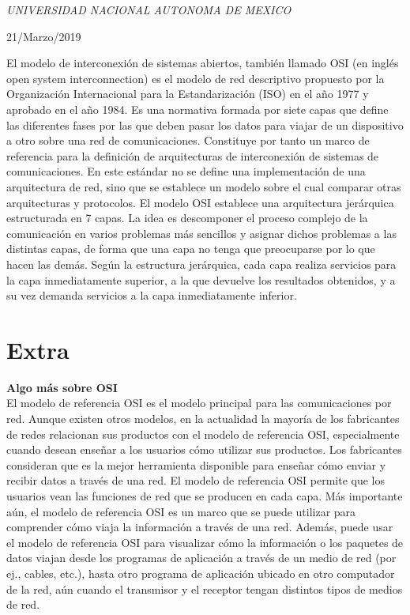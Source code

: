 \documentclass[a4paper, 11pt, oneside]{article}
\begin{document}
\begin{titlepage}
	\textit{UNIVERSIDAD NACIONAL AUTONOMA DE MEXICO} 
	
	\vfill
	
	
	
	
	\vspace{0.3\baselineskip} 
	
	21/Marzo/2019 
	
	 

\end{titlepage}
El modelo de interconexión de sistemas abiertos, también llamado OSI (en inglés open system interconnection) es el modelo de red descriptivo propuesto por la Organización Internacional para la Estandarización (ISO) en el año 1977 y aprobado en el año 1984. Es una normativa formada por siete capas que define las diferentes fases por las que deben pasar los datos para viajar de un dispositivo a otro sobre una red de comunicaciones. Constituye por tanto un marco de referencia para la definición de arquitecturas de interconexión de sistemas de comunicaciones. En este estándar no se define una implementación de una arquitectura de red, sino que se establece un modelo sobre el cual comparar otras arquitecturas y protocolos. El modelo OSI establece una arquitectura jerárquica estructurada en 7 capas. La idea es descomponer el proceso complejo de la comunicación en varios problemas más sencillos y asignar dichos problemas a las distintas capas, de forma que una capa no tenga que preocuparse por lo que hacen las demás. Según la estructura jerárquica, cada capa realiza servicios para la capa inmediatamente superior, a la que devuelve los resultados obtenidos, y a su vez demanda servicios a la capa inmediatamente inferior.

\section*{Extra}
\textbf{Algo más sobre OSI}\\
El modelo de referencia OSI es el modelo principal para las comunicaciones por red. Aunque existen otros
modelos, en la actualidad la mayoría de los fabricantes de redes relacionan sus productos con el modelo de referencia OSI, especialmente cuando desean enseñar a los usuarios cómo utilizar sus productos. Los
fabricantes consideran que es la mejor herramienta disponible para enseñar cómo enviar y recibir datos a través de una red. El modelo de referencia OSI permite que los usuarios vean las funciones de red que se producen en cada capa. Más importante aún, el modelo de referencia OSI es un marco que se puede utilizar para comprender cómo viaja la información a través de una red. Además, puede usar el modelo de referencia OSI para visualizar cómo la información o los paquetes de datos viajan desde los programas de aplicación a través de un medio de red (por ej., cables, etc.), hasta otro programa de aplicación ubicado en otro computador de la red, aún cuando el transmisor y el receptor tengan distintos tipos de medios de red. 
\end{document}
